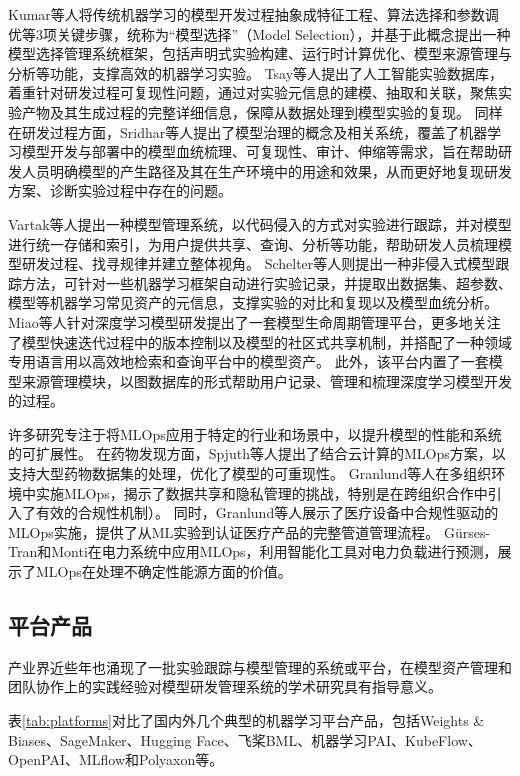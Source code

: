 Kumar等人\cite{Kum16}将传统机器学习的模型开发过程抽象成特征工程、算法选择和参数调优等3项关键步骤，统称为“模型选择”（Model Selection），并基于此概念提出一种模型选择管理系统框架，包括声明式实验构建、运行时计算优化、模型来源管理与分析等功能，支撑高效的机器学习实验。
Tsay等人\cite{Tsa22}提出了人工智能实验数据库，着重针对研发过程可复现性问题，通过对实验元信息的建模、抽取和关联，聚焦实验产物及其生成过程的完整详细信息，保障从数据处理到模型实验的复现。
同样在研发过程方面，Sridhar等人\cite{Sri18}提出了模型治理的概念及相关系统，覆盖了机器学习模型开发与部署中的模型血统梳理、可复现性、审计、伸缩等需求，旨在帮助研发人员明确模型的产生路径及其在生产环境中的用途和效果，从而更好地复现研发方案、诊断实验过程中存在的问题。

Vartak等人\cite{Var16}提出一种模型管理系统，以代码侵入的方式对实验进行跟踪，并对模型进行统一存储和索引，为用户提供共享、查询、分析等功能，帮助研发人员梳理模型研发过程、找寻规律并建立整体视角。
Schelter等人\cite{Sch17}则提出一种非侵入式模型跟踪方法，可针对一些机器学习框架自动进行实验记录，并提取出数据集、超参数、模型等机器学习常见资产的元信息，支撑实验的对比和复现以及模型血统分析。
Miao等人\cite{Mia17}针对深度学习模型研发提出了一套模型生命周期管理平台，更多地关注了模型快速迭代过程中的版本控制以及模型的社区式共享机制，并搭配了一种领域专用语言用以高效地检索和查询平台中的模型资产。
此外，该平台内置了一套模型来源管理模块，以图数据库的形式帮助用户记录、管理和梳理深度学习模型开发的过程。

许多研究专注于将MLOps应用于特定的行业和场景中，以提升模型的性能和系统的可扩展性。
在药物发现方面，Spjuth等人\cite{Spj21}提出了结合云计算的MLOps方案，以支持大型药物数据集的处理，优化了模型的可重现性。
Granlund等人\cite{Gra21a}在多组织环境中实施MLOps，揭示了数据共享和隐私管理的挑战，特别是在跨组织合作中引入了有效的合规性机制）。
同时，Granlund等人\cite{Gra21b}展示了医疗设备中合规性驱动的MLOps实施，提供了从ML实验到认证医疗产品的完整管道管理流程。
Gürses-Tran和Monti\cite{Gur22}在电力系统中应用MLOps，利用智能化工具对电力负载进行预测，展示了MLOps在处理不确定性能源方面的价值。

\subsection{平台产品}

产业界近些年也涌现了一批实验跟踪与模型管理的系统或平台\cite{wandb, neptuneai, huggingface}，在模型资产管理和团队协作上的实践经验对模型研发管理系统的学术研究具有指导意义。

表\ref{tab:platforms}对比了国内外几个典型的机器学习平台产品，包括Weights \& Biases、SageMaker、Hugging Face、飞桨BML、机器学习PAI、KubeFlow、OpenPAI、MLflow和Polyaxon等。

